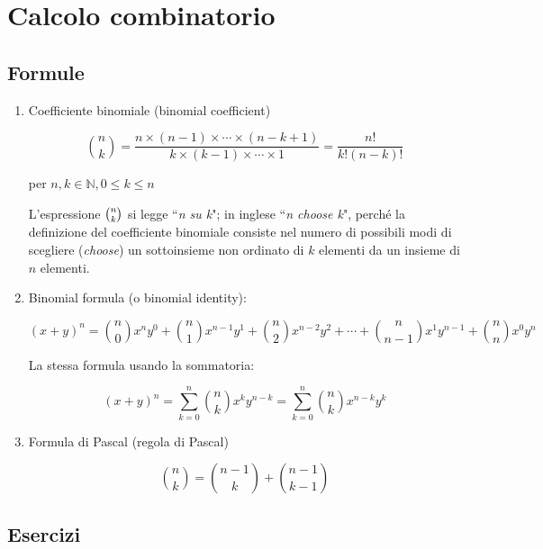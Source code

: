 \section{Calcolo combinatorio}\label{subsec:calcolo_combinatorio}

\subsection{Formule}
\setcounter{equation}{0}

\begin{enumerate}

\item 
Coefficiente binomiale (binomial coefficient)

\begin{equation}
\binom{n}{k} = \frac{
n\times (n-1)\times\cdots\times(n-k+1)
}{
k\times(k-1)\times\cdots\times1
}
=\frac{n!}{k!(n-k)!}
\end{equation}



per $n,k\in \mathbb{N} ,0\leq k\leq n$

L'espressione $\tbinom{n}{k}$ si legge ``\emph{n su k}"; in inglese ``\emph{n choose k}", perché la definizione del coefficiente binomiale consiste nel numero di possibili modi di scegliere (\emph{choose}) un sottoinsieme non ordinato di $k$ elementi da un insieme di $n$ elementi. 

\item
Binomial formula (o binomial identity):

\[
(x+y)^n=
\binom{n}{0}x^{n}y^0+
\binom{n}{1}x^{n-1}y^1+
\binom{n}{2}x^{n-2}y^2+\cdots+
\binom{n}{n-1}x^{1}y^{n-1}+
\binom{n}{n}x^{0}y^{n}
\]

La stessa formula usando la sommatoria:

\begin{equation}
(x+y)^n=\sum_{k=0}^{n}{\binom{n}{k}x^{k}y^{n-k}}
=\sum_{k=0}^{n}{\binom{n}{k}x^{n-k}y^{k}}
\end{equation}


\item
Formula di Pascal (regola di Pascal)

\begin{equation}\label{formula_pascal}
{n \choose k}={n-1 \choose k}+{n-1 \choose k-1}
\end{equation}

\end{enumerate}

\subsection{Esercizi}

